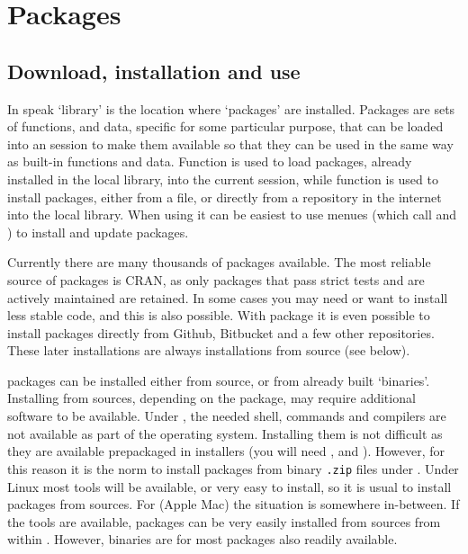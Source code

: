 \documentclass[krantz2]{krantz}\usepackage{knitr}%
\begin{document}
\section{Packages}\label{sec:script:packages}

\subsection{Download, installation and use}

In  speak `library' is the location where `packages' are installed. Packages are sets of functions, and data, specific for some particular purpose, that can be loaded into an \Rlang session to make them available so that they can be used in the same way as built-in \Rlang functions and data. Function  is used to load packages, already installed in the local \Rlang library, into the current session, while function  is used to install packages, either from a file, or directly from a repository in the internet into the local library. When using \RStudio it can be easiest to use \RStudio menues (which call  and ) to install and update packages.

\begin{knitrout}\footnotesize
{}\color{fgcolor}\begin{kframe}
\begin{alltt}
\end{alltt}
\end{kframe}
\end{knitrout}

Currently there are many thousands of packages available. The most reliable source of packages is CRAN, as only packages that pass strict tests and are actively maintained are retained. In some cases you may need or want to install less stable code, and this is also possible. With package  it is even possible to install packages directly from Github, Bitbucket and a few other repositories. These later installations are always installations from source (see below).

\Rpgrm packages can be installed either from source, or from already built `binaries'. Installing from sources, depending on the package, may require additional software to be available. Under , the needed shell, commands and compilers are not available as part of the operating system. Installing them is not difficult as they are available prepackaged in installers (you will need , and ). However, for this reason it is the norm to install packages from binary \texttt{.zip} files under . Under Linux most tools will be available, or very easy to install, so it is usual to install packages from sources. For  (Apple Mac) the situation is somewhere in-between. If the tools are available, packages can be very easily installed from sources from within \RStudio. However, binaries are for most packages also readily available.
\end{document}
